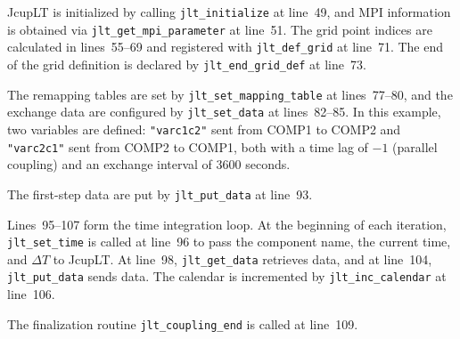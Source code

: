 \documentclass[11pt,a4paper]{report}
\begin{document}
JcupLT is initialized by calling
\texttt{jlt\_initialize} at line~49,
and MPI information is obtained
via \texttt{jlt\_get\_mpi\_parameter} at line~51.
The grid point indices are calculated in lines~55--69
and registered with \texttt{jlt\_def\_grid} at line~71.
The end of the grid definition
is declared by \texttt{jlt\_end\_grid\_def} at line~73.

The remapping tables are set
by \texttt{jlt\_set\_mapping\_table} at lines~77--80,
and the exchange data are configured
by \texttt{jlt\_set\_data} at lines~82--85.
In this example, two variables are defined:
\texttt{"varc1c2"} sent from COMP1 to COMP2
and \texttt{"varc2c1"} sent from COMP2 to COMP1,
both with a time lag of $-1$ (parallel coupling)
and an exchange interval of 3600 seconds.

The first-step data are put
by \texttt{jlt\_put\_data} at line~93.

Lines~95--107 form the time integration loop.
At the beginning of each iteration,
\texttt{jlt\_set\_time} is called at line~96
to pass the component name,
the current time, and $\Delta T$ to JcupLT.
At line~98, \texttt{jlt\_get\_data} retrieves data,
and at line~104,
\texttt{jlt\_put\_data} sends data.
The calendar is incremented
by \texttt{jlt\_inc\_calendar} at line~106.

The finalization routine \texttt{jlt\_coupling\_end}
is called at line~109.
\end{document}

